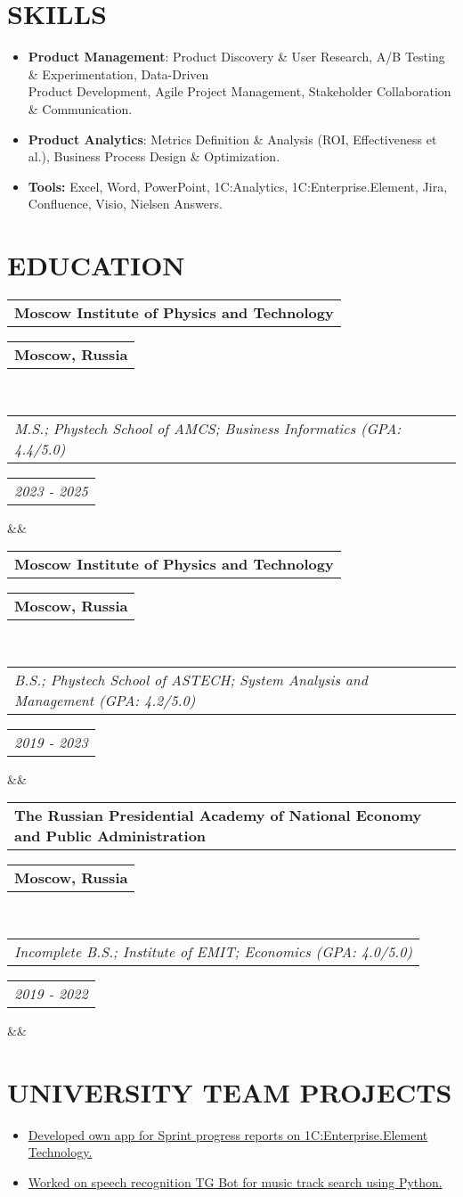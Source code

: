 \documentclass[11pt,a4paper,sans]{moderncv}        %
\makeatletter
\newcommand*{\customcventry}[7][.25em]{
  \begin{tabular}{@{}l} 
    {\bfseries #4}
  \end{tabular}
  \hfill%
  \begin{tabular}{l@{}}
     {\bfseries #5}
  \end{tabular} \\
  \begin{tabular}{@{}l} 
    {\itshape #3}
  \end{tabular}
  \hfill%
  \begin{tabular}{l@{}}
     {\itshape #2}
  \end{tabular}
  \ifx&#7&%
  \else{\\%
    \begin{minipage}{\maincolumnwidth}%
      \small#7%
    \end{minipage}}\fi%
  \par\addvspace{#1}}
\makeatother
\begin{document}
\section{SKILLS}
\begin{itemize}
\item \textbf{Product Management}: Product Discovery \& User Research, A/B Testing \& Experimentation, Data-Driven\\ Product Development, Agile Project Management, Stakeholder Collaboration \& Communication.
\item \textbf{Product Analytics}: Metrics Definition \& Analysis (ROI, Effectiveness et al.),
Business Process Design \& Optimization.
\item \textbf{Tools:} Excel, Word, PowerPoint, 1C:Analytics, 1C:Enterprise.Element, Jira, Confluence, Visio, Nielsen Answers.
\end{itemize}

\section{EDUCATION}
{\customcventry{2023 - 2025}{M.S.; Phystech School of AMCS; Business Informatics (GPA: 4.4/5.0)}{Moscow Institute of Physics and Technology}{Moscow, Russia}{}{}}
{\customcventry{2019 - 2023}{B.S.; Phystech School of ASTECH; System Analysis and Management (GPA: 4.2/5.0)}{Moscow Institute of Physics and Technology}{Moscow, Russia}{}{}}
{\customcventry{2019 - 2022}{Incomplete B.S.; Institute of EMIT; Economics (GPA: 4.0/5.0)}{The Russian Presidential Academy of National Economy and Public Administration}{Moscow, Russia}{}{}}

\section{UNIVERSITY TEAM PROJECTS}
{
  {\begin{itemize}
  \item \href{https://disk.yandex.com/d/EUMrDL89-MqzmQ}{Developed own app for Sprint progress reports on 1C:Enterprise.Element Technology.}
  \item \href{https://github.com/alievgithub/SpeechRecognitionBot}{Worked on speech recognition TG Bot for music track search using Python.}
  \end{itemize}
  }
}



\end{document}
